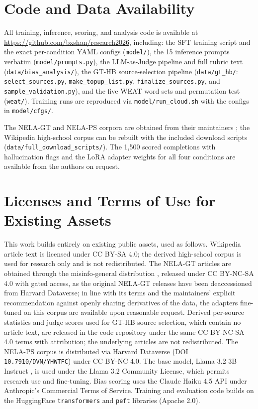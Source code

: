 \documentclass[12pt]{article}
\begin{document}
\section{Code and Data Availability}
  All training, inference, scoring, and analysis code is available at \url{https://github.com/bxshan/research2026}, including: 
  the SFT training script and the exact per-condition YAML configs (\texttt{model/}), 
  the 15 inference prompts verbatim (\texttt{model/prompts.py}), 
  the LLM-as-Judge pipeline and full rubric text (\texttt{data/bias\_analysis/}),
  the GT-HB source-selection pipeline (\texttt{data/gt\_hb/}: \texttt{select\_sources.py}, \texttt{make\_topup\_list.py}, \texttt{finalize\_sources.py}, and \texttt{sample\_validation.py}),
  and the five WEAT word sets and permutation test (\texttt{weat/}).
  Training runs are reproduced via \texttt{model/run\_cloud.sh} with the configs in \texttt{model/cfgs/}.

  The NELA-GT and NELA-PS corpora are obtained from their maintainers \cite{verhoeven2024, horne2024nelaps}; the Wikipedia high-school corpus can be rebuilt with the included download scripts \\(\texttt{data/full\_download\_scripts/}). 
  The 1{,}500 scored completions with hallucination flags and the LoRA adapter weights for all four conditions are available from the authors on request.

\section{Licenses and Terms of Use for Existing Assets}
  This work builds entirely on existing public assets, used as follows.
  Wikipedia article text \cite{wikimedia} is licensed under CC BY-SA 4.0; 
  the derived high-school corpus is used for research only and is not redistributed. 
  The NELA-GT articles are obtained through the misinfo-general distribution \cite{verhoeven2024}, released under CC BY-NC-SA 4.0 with gated access, as the original NELA-GT releases \cite{gruppi2023nela} have been deaccessioned from Harvard Dataverse; 
  in line with its terms and the maintainers' explicit recommendation against openly sharing derivatives of the data, the adapters fine-tuned on this corpus are available upon reasonable request.
  Derived per-source statistics and judge scores used for GT-HB source selection, which contain no article text, are released in the code repository under the same CC BY-NC-SA 4.0 terms with attribution; the underlying articles are not redistributed.
  The NELA-PS corpus \cite{horne2024nelaps} is distributed via Harvard Dataverse (DOI \texttt{10.7910/DVN/YHWTFC}) under CC BY-NC 4.0. 
  The base model, Llama 3.2 3B Instruct \cite{dubey2024llama}, is used under the Llama 3.2 Community License, which permits research use and fine-tuning. 
  Bias scoring uses the Claude Haiku 4.5 API \cite{anthropic2025haiku} under Anthropic's Commercial Terms of Service. 
  Training and evaluation code builds on the HuggingFace \texttt{transformers} and \texttt{peft} libraries (Apache 2.0).

\clearpage


\end{document}
